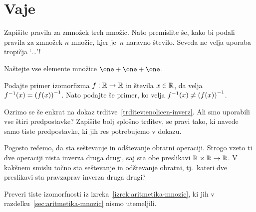 \section{Vaje}


\begin{vaja}
  Zapišite pravila za zmnožek treh množic. Nato premislite še, kako bi podali pravila za
  zmnožek $n$ množic, kjer je~$n$ naravno število. Seveda ne velja uporaba tropičja `\dots'!
\end{vaja}

\begin{vaja}
  Naštejte vse elemente množice $\one + \one + \one$.
\end{vaja}

\begin{vaja}
  Podajte primer izomorfizma $f : \mathbb{R} \to \mathbb{R}$ in števila $x \in \mathbb{R}$, da velja
  ${f}^{-1}(x) = {(f(x))}^{-1}$. Nato podajte še primer, ko velja
  ${f}^{-1}(x) \neq {(f(x))}^{-1}$.
\end{vaja}

\begin{vaja}
  Ozrimo se še enkrat na dokaz trditve~\ref{trditev:enolicen-inverz}. Ali smo uporabili vse štiri predpostavke?
  Zapišite bolj splošno trditev, se pravi tako, ki navede samo tiste predpostavke,
  ki jih res potrebujemo v dokazu.
\end{vaja}

\begin{vaja}
  Pogosto rečemo, da sta seštevanje in odštevanje obratni operaciji. Strogo vzeto ti dve
  operaciji nista inverza druga drugi, saj sta obe preslikavi $\mathbb{R} \times \mathbb{R} \to \mathbb{R}$.
  V kakšnem smislu točno sta seštevanje in odštevanje obratni, tj.~kateri dve preslikavi
  sta pravzaprav inverza druga drugi?
\end{vaja}

\begin{vaja}
  Preveri tiste izomorfnosti iz izreka~\ref{izrek:aritmetika-mnozic}, ki jih v
  razdelku~\ref{sec:aritmetika-mnozic} nismo utemeljili.
\end{vaja}
